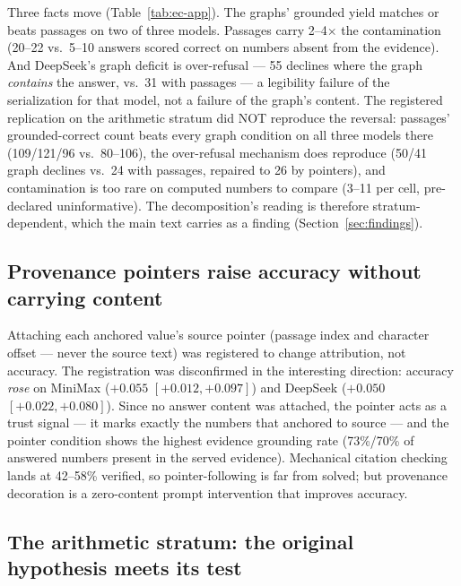 \documentclass{article}
\begin{document}
Three facts move (Table~\ref{tab:ec-app}). The graphs' grounded yield matches or
beats passages on two of three models. Passages carry 2--4$\times$ the
contamination (20--22 vs.\ 5--10 answers scored correct on numbers absent
from the evidence). And DeepSeek's graph deficit is over-refusal --- 55
declines where the graph \emph{contains} the answer, vs.\ 31 with passages
--- a legibility failure of the serialization for that model, not a failure
of the graph's content. The registered replication on the arithmetic
stratum did NOT reproduce the reversal: passages' grounded-correct count
beats every graph condition on all three models there (109/121/96 vs.\
80--106), the over-refusal mechanism does reproduce (50/41 graph declines
vs.\ 24 with passages, repaired to 26 by pointers), and contamination is
too rare on computed numbers to compare (3--11 per cell, pre-declared
uninformative). The decomposition's reading is therefore stratum-dependent,
which the main text carries as a finding (Section~\ref{sec:findings}).

\subsection{Provenance pointers raise accuracy without carrying content}

Attaching each anchored value's source pointer (passage index and character
offset --- never the source text) was registered to change attribution, not
accuracy. The registration was disconfirmed in the interesting direction:
accuracy \emph{rose} on MiniMax ($+0.055$ $[+0.012, +0.097]$) and DeepSeek
($+0.050$ $[+0.022, +0.080]$). Since no answer content was attached, the
pointer acts as a trust signal --- it marks exactly the numbers that
anchored to source --- and the pointer condition shows the highest evidence
grounding rate (73\%/70\% of answered numbers present in the served
evidence). Mechanical citation checking lands at 42--58\% verified, so
pointer-following is far from solved; but provenance decoration is a
zero-content prompt intervention that improves accuracy.

\subsection{The arithmetic stratum: the original hypothesis meets its test}
\end{document}

